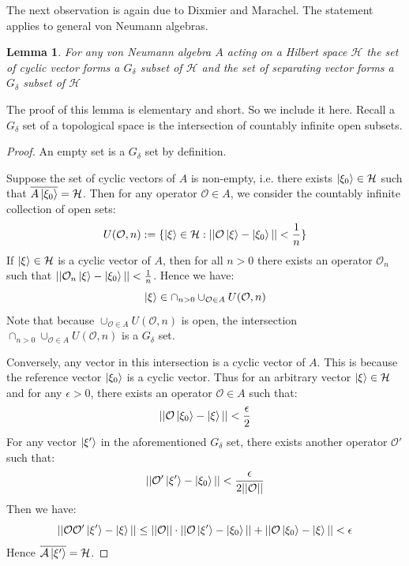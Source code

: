 \documentclass[a4paper,11pt]{article}
\newtheorem{lemma}[theorem]{Lemma}
\theoremstyle{definition}
\begin{document}
The next observation is again due to Dixmier and Marachel\cite{dixmiermarechal}. The statement applies to general von Neumann algebras.
\begin{lemma}
    For any von Neumann algebra $A$ acting on a Hilbert space $\mathcal{H}$ the set of cyclic vector forms a $G_\delta$ subset of $\mathcal{H}$ and the set of separating vector forms a $G_\delta$ subset of $\mathcal{H}$
\end{lemma}
The proof of this lemma is elementary and short. So we include it here. Recall a $G_\delta$ set of a topological space is the intersection of countably infinite open subsets. 
\begin{proof}
    An empty set is a $G_\delta$ set by definition.

    Suppose the set of cyclic vectors of $A$ is non-empty, i.e. there exists $\ket{\xi_0}\in \mathcal{H}$ such that $\overline{A\ket{\xi_0}}= \mathcal{H}$. Then for any operator $\mathcal{O}\in A$, we consider the countably infinite collection of open sets:
    \begin{equation}
        U(\mathcal{O},n):=\{\ket{\xi}\in\mathcal{H}:||\mathcal{O}\ket{\xi} - \ket{\xi_0}|| < \frac{1}{n}\}
    \end{equation}
    If $\ket{\xi}\in\mathcal{H}$ is a cyclic vector of $A$, then for all $n > 0$ there exists an operator $\mathcal{O}_n$ such that $||\mathcal{O}_n\ket{\xi} - \ket{\xi_0}|| < \frac{1}{n}$. Hence we have:
    \begin{equation}
        \ket{\xi}\in \cap_{n > 0}\cup_{\mathcal{O}\in A}U(\mathcal{O}, n)
    \end{equation}
    Note that because $\cup_{\mathcal{O}\in A} U(\mathcal{O}, n)$ is open, the intersection $\cap_{n > 0}\cup_{\mathcal{O}\in A}U(\mathcal{O}, n)$ is a $G_\delta$ set. 
    
    Conversely, any vector in this intersection is a cyclic vector of $A$. This is because the reference vector $\ket{\xi_0}$ is a cyclic vector. Thus for an arbitrary vector $\ket{\xi}\in\mathcal{H}$ and for any $\epsilon  > 0$, there exists an operator $\mathcal{O}\in A$ such that:
    \begin{equation}
        ||\mathcal{O}\ket{\xi_0} - \ket{\xi}|| < \frac{\epsilon}{2}
    \end{equation}
    For any vector $\ket{\xi'}$ in the aforementioned $G_\delta$ set, there exists another operator $\mathcal{O}'$ such that:
    \begin{equation}
        ||\mathcal{O}'\ket{\xi'
        } - \ket{\xi_0}|| < \frac{\epsilon}{2 ||\mathcal{O}||}
    \end{equation}
    Then we have:
    \begin{equation}
        ||\mathcal{O}\mathcal{O}'\ket{\xi'} - \ket{\xi}||\leq||\mathcal{O}||\cdot||\mathcal{O}\ket{\xi'} - \ket{\xi_0}|| + ||\mathcal{O}\ket{\xi_0} - \ket{\xi}|| <\epsilon
    \end{equation}
    Hence $\overline{\mathcal{A}\ket{\xi'}} = \mathcal{H}$. 


\end{proof}
\end{document}
